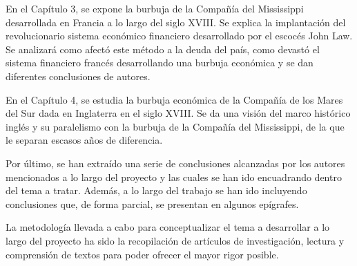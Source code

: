 En el Capítulo 3, se expone la burbuja de la Compañía del Mississippi
desarrollada en Francia a lo largo del siglo XVIII. Se explica la
implantación del revolucionario sistema económico financiero
desarrollado por el escocés John Law. Se analizará como afectó este
método a la deuda del país, como devastó el sistema financiero francés
desarrollando una burbuja económica y se dan diferentes conclusiones
de autores. 

En el Capítulo 4, se estudia la burbuja económica de la Compañía de los
Mares del Sur dada en Inglaterra en el siglo XVIII. Se da una visión
del marco histórico inglés y su paralelismo con la burbuja de la
Compañía del Mississippi, de la que le separan escasos años de
diferencia. 

Por último, se han extraído una serie de conclusiones alcanzadas por los
autores mencionados a lo largo del proyecto y las cuales se han ido
encuadrando dentro del tema a tratar. Además, a lo largo del trabajo se
han ido incluyendo conclusiones que, de forma parcial, se presentan en
algunos epígrafes.

La metodología llevada a cabo para conceptualizar el tema a desarrollar
a lo largo del proyecto ha sido la recopilación de artículos de
investigación, lectura y comprensión de textos para poder ofrecer el mayor rigor posible. 
